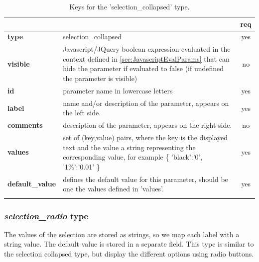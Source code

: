 \begin{longtable}{|>{\bf}L{\linewidth}|L{\linewidth}|c|}
\hline
      &  & {\bf req} 
\tabularnewline \hline \hline
 type  & selection\_collapsed    & yes \\ \hline
 visible  & Javascript/JQuery boolean expression evaluated in the context defined 
              in \ref{sec:JavascriptEvalParams} that can hide the parameter if
            evaluated to false (if undefined the parameter is visible)& no \\ \hline
 id     & parameter name in lowercase letters & yes \\ \hline
 label  & name and/or description of the parameter, appears on the left side. & yes
                      \\ \hline
 comments & description of the parameter, appears on the right side. & no
                      \\ \hline
 values & set of (key,value) pairs, where the key is the displayed text and the 
value a string representing the corresponding value, for example \{ 
'black':'0', '1\%':'0.01' \} & yes
                      \\ \hline
 default\_value & defines the default value for this parameter, should be one 
the values defined in 'values'. & yes \\ \hline
\caption{Keys for the 'selection\_collapsed' type.}
\end{longtable}

\subsubsection{ \emph{selection\_radio} type}

The values of the selection are stored as strings, so we map each label with a 
string value. The default value is stored in a separate field.
This type is similar to the selection collapsed type, but display the different
options using radio buttons.

